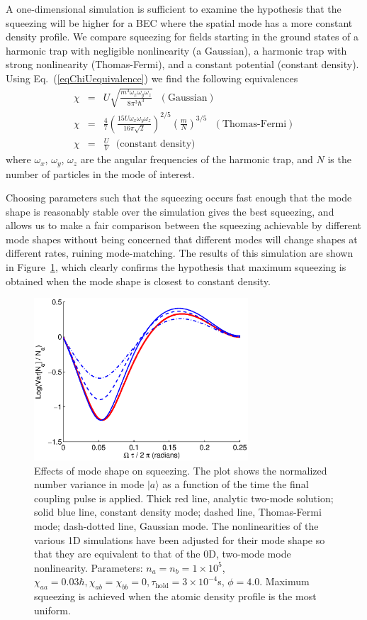 \documentclass{iopart}
\begin{document}
A one-dimensional simulation is sufficient to examine the hypothesis that the squeezing will be higher for a BEC where the spatial mode has a more constant density profile.  We compare squeezing for fields starting in the ground states of a harmonic trap with negligible nonlinearity (a Gaussian), a harmonic trap with strong nonlinearity (Thomas-Fermi), and a constant potential (constant density). Using Eq.~(\ref{eqChiUequivalence}) we find the following equivalences
\begin{eqnarray}
\chi &=& U \sqrt{\frac{m^3 \omega_x \omega_y \omega_z}{8 \pi^3 \hbar^3}} \,\,\,\, ({\textrm{Gaussian}}) \\
%
\chi &=& \frac{4}{7} \left( \frac{15 U \omega_x \omega_y \omega_z}{16 \pi \sqrt{2}} \right)^{2/5} \left( \frac{m}{N} \right)^{3/5} \,\,\,\, ({\textrm{Thomas-Fermi}}) \\
%
\chi &=& \frac{U}{V} \,\,\,\, {\textrm{(constant density)}}
\end{eqnarray}
%
where $\omega_x$, $\omega_y$, $\omega_z$ are the angular frequencies of the harmonic trap, and $N$ is the number of particles in the mode of interest.

Choosing parameters such that the squeezing occurs fast enough that the mode shape is reasonably stable over the simulation gives the best squeezing, and allows us to make a fair comparison between the squeezing achievable by different mode shapes without being concerned that different modes will change shapes at different rates, ruining mode-matching. The results of this simulation are shown in Figure~\ref{figModalSqueezingEffects1D}, which clearly confirms the hypothesis that maximum squeezing is obtained when the mode shape is closest to constant density.

\begin{figure}
    \centering
    \includegraphics[width=8cm]{figures/modal_squeezing_effects_1D.eps}
    \caption{Effects of mode shape on squeezing. The plot shows the normalized number variance in mode $|a \rangle$ as a function of the time the final coupling pulse is applied. Thick red line, analytic two-mode solution; solid blue line, constant density mode; dashed line, Thomas-Fermi mode; dash-dotted line, Gaussian mode. The nonlinearities of the various 1D simulations have been adjusted for their mode shape so that they are equivalent to that of the 0D, two-mode mode nonlinearity. Parameters: $n_a = n_b =1 \times 10^5$, $\chi_{aa}=0.03 \hbar, \chi_{ab}=\chi_{bb}=0, \tau_{\mathrm{hold}}=3\times 10^{-4}$s, $\phi=4.0$. Maximum squeezing is achieved when the atomic density profile is the most uniform.}
    \label{figModalSqueezingEffects1D}
\end{figure}
\end{document}
